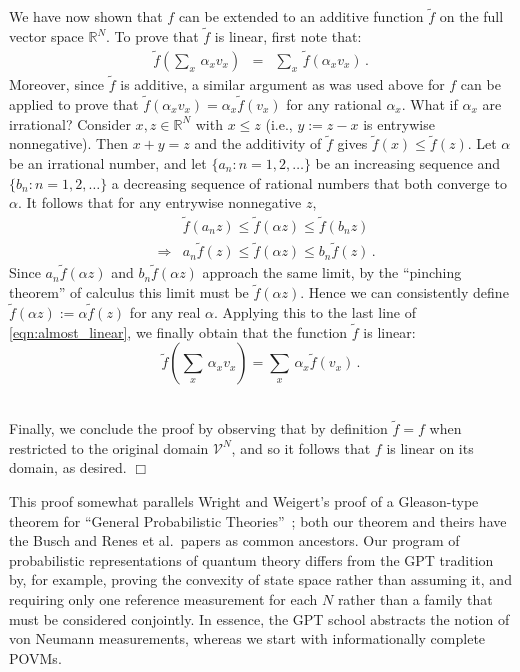 \documentclass[%
 reprint,superscriptaddress,
 amsmath,amssymb,
 aps,twocolumn,pra
]{revtex4-1}
\newcommand{\eqn}[1]{\begin{eqnarray} #1 \end{eqnarray}}
\newcommand{\zum}[2]{\displaystyle\sum_{#1}^{#2}}
\begin{document}
\begin{appendix}
We have now shown that $f$ can be extended to an additive function $\tilde{f}$ on the full vector space $\mathbb{R}^{N}$. To prove that $\tilde{f}$ is linear, first note that:
\eqn{ \label{eqn:almost_linear}
\tilde{f}\left( \zum{x}{}\, \alpha_x v_x \right) &=& \zum{x}{}\, \tilde{f}\left( \alpha_x v_x \right) \, .
}
Moreover, since $\tilde{f}$ is additive, a similar argument as was used above for $f$ can be applied to prove that $\tilde{f}(\alpha_x v_x) = \alpha_x \tilde{f}(v_x)$ for any rational $\alpha_x$. What if $\alpha_x$ are irrational? Consider $x,z \in \mathbb{R}^N$ with $x \leq z$ (i.e., $y := z - x$ is entrywise nonnegative). Then $x + y = z$ and the additivity of $\tilde{f}$ gives $\tilde{f}(x) \leq \tilde{f}(z)$. Let $\alpha$ be an irrational number, and let $\{a_n : n = 1,2,\dots \}$ be an increasing sequence and $\{b_n : n = 1,2,\dots \}$ a decreasing sequence of rational numbers that both converge to $\alpha$. It follows that for any entrywise nonnegative $z$,
\eqn{
&& \tilde{f}(a_n z) \leq \tilde{f}(\alpha z) \leq \tilde{f}(b_n z) \nonumber \\
&\Rightarrow& a_n \tilde{f}(z) \leq \tilde{f}(\alpha z) \leq b_n \tilde{f}(z) \, .
}
Since $a_n \tilde{f}(\alpha z)$ and $b_n \tilde{f}(\alpha z)$ approach the same limit, by the ``pinching theorem'' of calculus this limit must be $\tilde{f}(\alpha z)$. Hence we can consistently define $\tilde{f}(\alpha z) := \alpha \tilde{f}(z)$ for any real $\alpha$. Applying this to the last line of \eqref{eqn:almost_linear}, we finally obtain that the function $\tilde{f}$ is linear:
\begin{equation}
\tilde{f}\left( \sum_x \, \alpha_x v_x \right) = \sum_x \, \alpha_x \tilde{f}\left( v_x \right) \, .
\end{equation}

\ \\

Finally, we conclude the proof by observing that by definition $\tilde{f} = f$ when restricted to the original domain $\mathcal{V}^N$, and so it follows that $f$ is linear on its domain, as desired. $\Box$

\bigskip

This proof somewhat parallels Wright and Weigert's proof of a Gleason-type theorem for ``General Probabilistic Theories''~\cite{WRIGHT}; both our theorem and theirs have the Busch and Renes et al.\ papers as common ancestors. Our program of probabilistic representations of quantum theory differs from the GPT tradition by, for example, proving the convexity of state space rather than assuming it, and requiring only one reference measurement for each $N$ rather than a family that must be considered conjointly. In essence, the GPT school abstracts the notion of von Neumann measurements, whereas we start with informationally complete POVMs.

\end{appendix}
\end{document}
